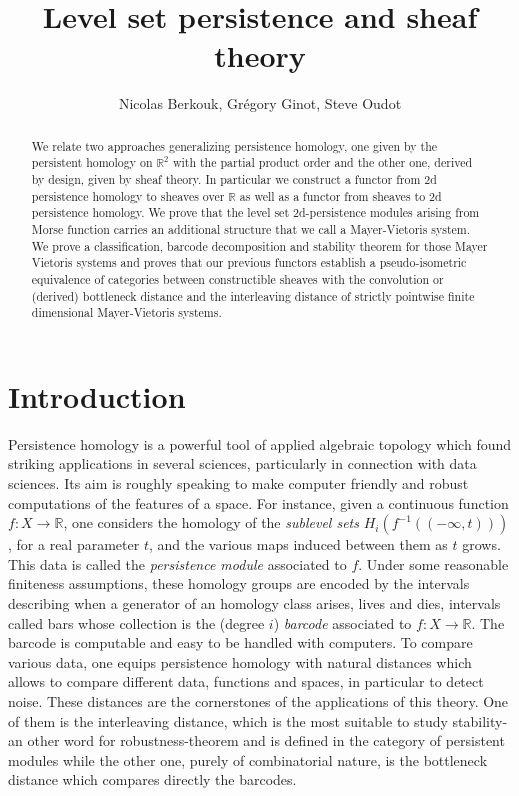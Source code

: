\documentclass[a4paper, english, 11pt]{article}
\author{Nicolas Berkouk, Grégory Ginot, Steve Oudot}
\newcommand{\0}{\vec{0}}
\newcommand{\R}[0]{\mathbb{R}}
\begin{document}

\title{Level set persistence and sheaf theory}
\maketitle
\begin{abstract}
   We relate two approaches generalizing persistence homology, one given by the persistent homology on $\R^2$ with the partial product order and the other one, derived by design, given by sheaf theory. In particular we construct a functor from 2d persistence homology to sheaves over $\R$ as well as a functor from sheaves to 2d persistence homology. We prove that the level set 2d-persistence modules arising from Morse function carries an additional structure that we call a Mayer-Vietoris system. We prove a classification, barcode decomposition and stability theorem for those Mayer Vietoris systems and proves that our previous functors establish a pseudo-isometric equivalence of categories between constructible sheaves with the convolution or (derived) bottleneck distance and the interleaving distance of strictly pointwise finite dimensional Mayer-Vietoris systems.
\end{abstract}

\tableofcontents

\section{Introduction}
Persistence homology is a powerful tool of applied algebraic topology which found striking applications in several sciences, particularly in connection with data sciences. 
Its aim is roughly speaking to  make computer friendly and robust computations of the features of a space. For instance, given a continuous function $f: X\to \R$, one  considers the homology of the \emph{sublevel sets} $H_i(f^{-1}((-\infty, t)))$, for a real parameter $t$, and the various maps induced between them as $t$ grows. This data is called the \emph{persistence module} associated to $f$. Under some reasonable finiteness assumptions, these homology groups are encoded by the intervals describing when a generator of an homology class arises, lives and dies, intervals called bars whose collection is the (degree $i$) \emph{barcode} associated to $f:X\to \R$. The barcode is computable and easy to be handled with computers. To compare various data, one equips persistence homology with natural distances which allows to compare different data, functions and spaces, in particular to detect noise.
These distances are the cornerstones of the applications of this theory. 
One of them is the interleaving distance, which is the most suitable to study stability-an other word for robustness-theorem and is defined in the category of persistent modules while the other one, purely of combinatorial nature, is the bottleneck distance which compares directly the barcodes. 
\end{document}
